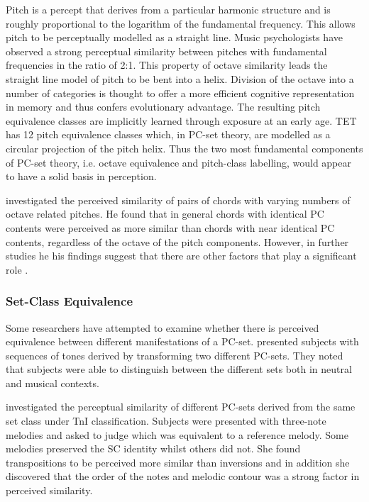 \documentclass{article}
\begin{document}
Pitch is a percept that derives from a particular harmonic structure
and is roughly proportional to the logarithm of the fundamental
frequency. This allows pitch to be perceptually modelled as a straight
line. Music psychologists have observed a strong perceptual similarity
between pitches with fundamental frequencies in the ratio of 2:1. This
property of octave similarity leads the straight line model of pitch
to be bent into a helix. Division of the octave into a number of
categories is thought to offer a more efficient cognitive
representation in memory and thus confers evolutionary advantage. The
resulting pitch equivalence classes are implicitly learned through
exposure at an early age. TET has 12 pitch equivalence classes which,
in PC-set theory, are modelled as a circular projection of the pitch
helix. Thus the two most fundamental components of PC-set theory,
i.e. octave equivalence and pitch-class labelling, would appear to
have a solid basis in perception.

\citet{Gibson1988} investigated the perceived similarity of pairs of
chords with varying numbers of octave related pitches. He found that
in general chords with identical PC contents were perceived as more
similar than chords with near identical PC contents, regardless of the
octave of the pitch components. However, in further studies he his
findings suggest that there are other factors that play a significant
role \citep{Gibson1993}.
\subsubsection{Set-Class Equivalence}
\label{sec-3-5-2}

Some researchers have attempted to examine whether there is perceived
equivalence between different manifestations of a
PC-set. \citet{KrumhanslSandell1987} presented subjects with sequences
of tones derived by transforming two different PC-sets. They noted
that subjects were able to distinguish between the different sets both
in neutral and musical contexts.  

\citet{Millar1984} investigated the perceptual similarity of different
PC-sets derived from the same set class under TnI
classification. Subjects were presented with three-note melodies and
asked to judge which was equivalent to a reference melody. Some
melodies preserved the SC identity whilst others did not. She found
transpositions to be perceived more similar than inversions and in
addition she discovered that the order of the notes and melodic
contour was a strong factor in perceived similarity.
\end{document}

